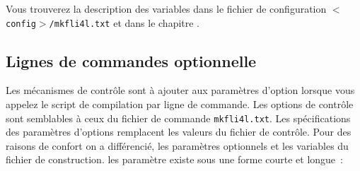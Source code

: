   Vous trouverez la description des variables dans le fichier de
  configuration \texttt{$<$config$>$/mkfli4l.txt} et dans le chapitre
  .


  \subsection{Lignes de commandes optionnelle}

  Les mécanismes de contrôle sont à ajouter aux paramètres d'option
  lorsque vous appelez le script de compilation par ligne de commande.
  Les options de contrôle sont semblables à ceux du fichier de commande \texttt{mkfli4l.txt}.
  Les spécifications des paramètres d'options remplacent les valeurs du fichier
  de contrôle. Pour des raisons de confort on a différencié, les paramètres
  optionnels et les variables du fichier de construction. les paramètre existe
  sous une forme courte et longue~:

